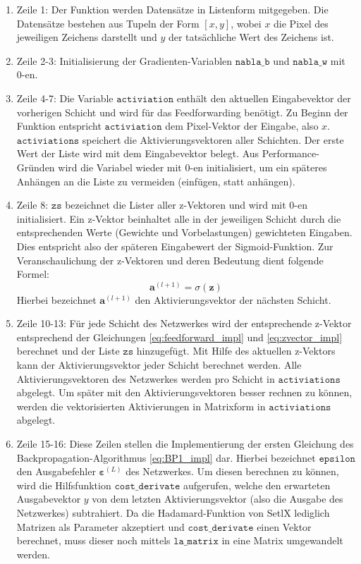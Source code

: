 \begin{enumerate}
\item Zeile 1: Der Funktion werden Datensätze in Listenform mitgegeben. Die Datensätze bestehen aus Tupeln der Form $[x,y]$, wobei $x$ die Pixel des jeweiligen Zeichens darstellt und $y$ der tatsächliche Wert des Zeichens ist.
\item Zeile 2-3: Initialisierung der Gradienten-Variablen $\mathtt{nabla\_b}$ und $\mathtt{nabla\_w}$ mit 0-en.
\item Zeile 4-7: Die Variable $\mathtt{activiation}$ enthält den aktuellen Eingabevektor der vorherigen Schicht und wird für das Feedforwarding benötigt. Zu Beginn der Funktion entspricht $\mathtt{activiation}$ dem Pixel-Vektor der Eingabe, also $x$. $\mathtt{activiations}$ speichert die Aktivierungsvektoren aller Schichten. Der erste Wert der Liste wird mit dem Eingabevektor belegt. Aus Performance-Gründen wird die Variabel wieder mit 0-en initialisiert, um ein späteres Anhängen an die Liste zu vermeiden (einfügen, statt anhängen).
\item Zeile 8: $\mathtt{zs}$ bezeichnet die Lister aller z-Vektoren und wird mit 0-en initialisiert. Ein z-Vektor beinhaltet alle in der jeweiligen Schicht durch die entsprechenden Werte (Gewichte und Vorbelastungen) gewichteten Eingaben. Dies entspricht also der späteren Eingabewert der Sigmoid-Funktion. Zur Veranschaulichung der z-Vektoren und deren Bedeutung dient folgende Formel:
\begin{equation} \label{eq:zvector_impl}
	\mathbf{a}^{(l+1)} = \sigma(\mathbf{z})
\end{equation} 
Hierbei bezeichnet $\mathbf{a}^{(l+1)}$ den Aktivierungsvektor der nächsten Schicht.
\item Zeile 10-13: Für jede Schicht des Netzwerkes wird der entsprechende z-Vektor entsprechend der Gleichungen \eqref{eq:feedforward_impl} und \eqref{eq:zvector_impl} berechnet und der Liste $\mathtt{zs}$ hinzugefügt. Mit Hilfe des aktuellen z-Vektors kann der Aktivierungsvektor jeder Schicht berechnet werden. Alle Aktivierungsvektoren des Netzwerkes werden pro Schicht in $\mathtt{activiations}$ abgelegt. Um später mit den Aktivierungsvektoren besser rechnen zu können, werden die vektorisierten Aktivierungen in Matrixform in $\mathtt{activiations}$ abgelegt.
\item Zeile 15-16: Diese Zeilen stellen die Implementierung der ersten Gleichung des Backpropagation-Algorithmus \eqref{eq:BP1_impl} dar. Hierbei bezeichnet $\mathtt{epsilon}$ den Ausgabefehler $\boldsymbol{\varepsilon}^{(L)}$ des Netzwerkes. Um diesen berechnen zu können, wird die Hilfsfunktion $\mathtt{cost\_derivate}$ aufgerufen, welche den erwarteten Ausgabevektor $y$ von dem letzten Aktivierungsvektor (also die Ausgabe des Netzwerkes) subtrahiert. Da die Hadamard-Funktion von SetlX lediglich Matrizen als Parameter akzeptiert und $\mathtt{cost\_derivate}$ einen Vektor berechnet, muss dieser noch mittels $\mathtt{la\_matrix}$ in eine Matrix umgewandelt werden.

\end{enumerate}
